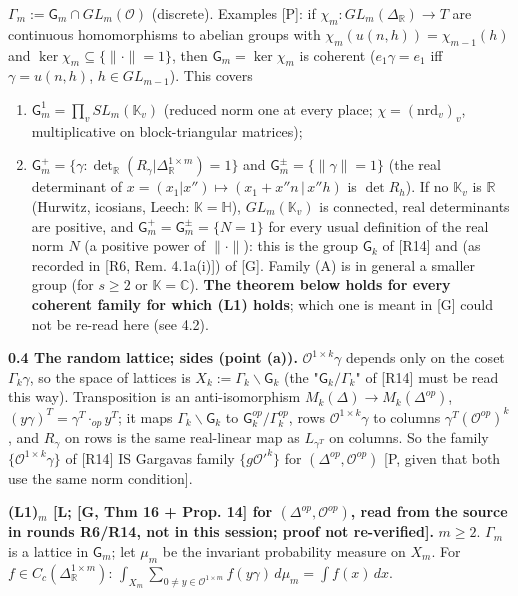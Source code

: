 \(\Gamma_m:=\mathsf G_m\cap GL_m(\mathcal O)\) (discrete). Examples {[}P{]}: if \(\chi_m:GL_m(\Delta_{\mathbb R})\to T\) are continuous homomorphisms to abelian groups with \(\chi_m(u(n,h))=\chi_{m-1}(h)\) and \(\ker\chi_m\subseteq\{\|\cdot\|=1\}\), then \(\mathsf G_m=\ker\chi_m\) is coherent (\(e_1\gamma=e_1\) iff \(\gamma=u(n,h)\), \(h\in GL_{m-1}\)). This covers

\begin{enumerate}
\def\labelenumi{(\Alph{enumi})}
\tightlist
\item
  \(\mathsf G^1_m=\prod_vSL_m(\mathbb K_v)\) (reduced norm one at every place; \(\chi=(\mathrm{nrd}_v)_v\), multiplicative on block-triangular matrices);
\item
  \(\mathsf G^{+}_m=\{\gamma:\det_{\mathbb R}(R_\gamma|\Delta_{\mathbb R}^{1\times m})=1\}\) and \(\mathsf G^{\pm}_m=\{\|\gamma\|=1\}\) (the real determinant of \(x=(x_1|x'')\mapsto(x_1+x''n\,|\,x''h)\) is \(\det R_h\)).
  If no \(\mathbb K_v\) is \(\mathbb R\) (Hurwitz, icosians, Leech: \(\mathbb K=\mathbb H\)), \(GL_m(\mathbb K_v)\) is connected, real determinants are positive, and \(\mathsf G^+_m=\mathsf G^\pm_m=\{N=1\}\) for every usual definition of the real norm \(N\) (a positive power of \(\|\cdot\|\)): this is the group \(\mathsf G_k\) of {[}R14{]} and (as recorded in {[}R6, Rem. 4.1a(i){]}) of {[}G{]}. Family (A) is in general a smaller group (for \(s\ge2\) or \(\mathbb K=\mathbb C\)). \textbf{The theorem below holds for every coherent family for which (L1) holds}; which one is meant in {[}G{]} could not be re-read here (see 4.2).
\end{enumerate}

\textbf{0.4 The random lattice; sides (point (a)).} \(\mathcal O^{1\times k}\gamma\) depends only on the coset \(\Gamma_k\gamma\), so the space of lattices is \(X_k:=\Gamma_k\backslash\mathsf G_k\) (the "\(\mathsf G_k/\Gamma_k\)" of {[}R14{]} must be read this way). Transposition is an anti-isomorphism \(M_k(\Delta)\to M_k(\Delta^{op})\), \((y\gamma)^T=\gamma^T\cdot_{op}y^T\); it maps \(\Gamma_k\backslash\mathsf G_k\) to \(\mathsf G_k^{op}/\Gamma_k^{op}\), rows \(\mathcal O^{1\times k}\gamma\) to columns \(\gamma^T(\mathcal O^{op})^k\), and \(R_\gamma\) on rows is the same real-linear map as \(L_{\gamma^T}\) on columns. So the family \(\{\mathcal O^{1\times k}\gamma\}\) of {[}R14{]} IS Gargava\textquotesingle s family \(\{g\mathcal O'^k\}\) for \((\Delta^{op},\mathcal O^{op})\) {[}P, given that both use the same norm condition{]}.

\textbf{(L1)\(_m\) {[}L; {[}G, Thm 16 + Prop. 14{]} for \((\Delta^{op},\mathcal O^{op})\), read from the source in rounds R6/R14, not in this session; proof not re-verified{]}.} \(m\ge2\). \(\Gamma_m\) is a lattice in \(\mathsf G_m\); let \(\mu_m\) be the invariant probability measure on \(X_m\). For \(f\in C_c(\Delta_{\mathbb R}^{1\times m})\): \(\int_{X_m}\sum_{0\ne y\in\mathcal O^{1\times m}}f(y\gamma)\,d\mu_m=\int f(x)\,dx\).

